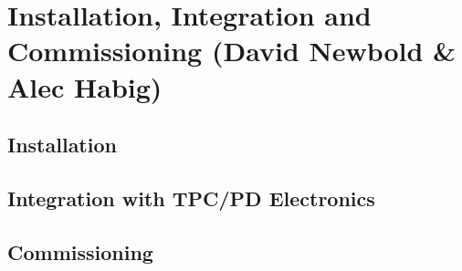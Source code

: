 
\section{Installation, Integration and Commissioning (David Newbold \& Alec Habig)}
\label{sec:fdsp-daq-install}


\subsection{Installation}
\label{sec:fdsp-daq-install-transport}


\subsection{Integration with TPC/PD Electronics}
\label{sec:fdsp-daq-install-transport}


\subsection{Commissioning}
\label{sec:fdsp-daq-commissioning}


%


%
%
%
%
%

